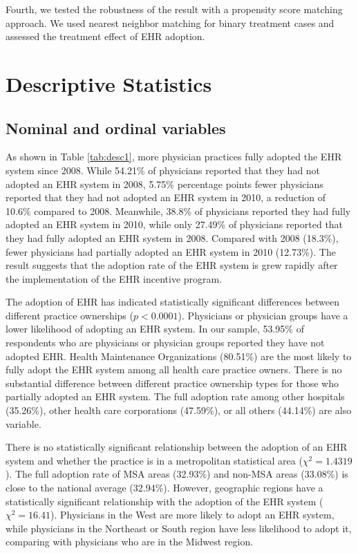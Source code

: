 \documentclass[12pt]{report}
\begin{document}
Fourth, we tested the robustness of the result with a propensity score matching approach. We used nearest neighbor matching for binary treatment cases and assessed the treatment effect of EHR adoption.


\chapter{Descriptive Statistics}
\label{chapter: desc}
\section{Nominal and ordinal variables}

As shown in Table \ref{tab:desc1}, more physician practices fully adopted the EHR system since 2008. While 54.21\% of physicians reported that they had not adopted an EHR system in 2008, 5.75\% percentage points fewer physicians reported that they had not adopted an EHR system in 2010, a reduction of 10.6\% compared to 2008. Meanwhile, 38.8\% of physicians reported they had fully adopted an EHR system in 2010, while only 27.49\% of physicians reported that they had fully adopted an EHR system in 2008. Compared with 2008 (18.3\%), fewer physicians had partially adopted an EHR system in 2010 (12.73\%). The result suggests that the adoption rate of the EHR system is grew rapidly after the implementation of the EHR incentive program.

The adoption of EHR has indicated statistically significant differences between different practice ownerships ($p<0.0001$). Physicians or physician groups have a lower likelihood of adopting an EHR system. In our sample, 53.95\% of respondents who are physicians or physician groups reported they have not adopted EHR. Health Maintenance Organizations (80.51\%) are the most likely to fully adopt the EHR system among all health care practice owners. There is no substantial difference between different practice ownership types for those who partially adopted an EHR system. The full adoption rate among other hospitals (35.26\%), other health care corporations (47.59\%), or all others (44.14\%) are also variable. 

There is no statistically significant relationship between the adoption of an EHR system and whether the practice is in a metropolitan statistical area ($\chi^2=1.4319$). The full adoption rate of MSA areas (32.93\%) and non-MSA areas (33.08\%) is close to the national average (32.94\%). However, geographic regions have a statistically significant relationship with the adoption of the EHR system ($\chi^2=16.41$). Physicians in the West are more likely to adopt an EHR system, while physicians in the Northeast or South region have less likelihood to adopt it, comparing with physicians who are in the Midwest region.
\end{document}
